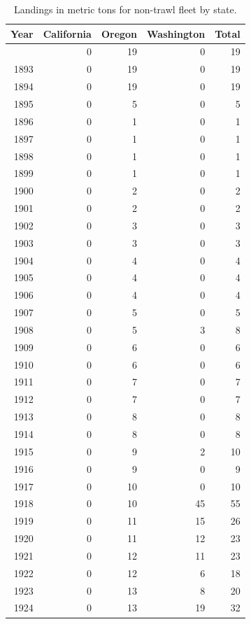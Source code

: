 \documentclass[
]{article}
\begin{document}
\begin{longtable}{rrrrr}

\caption{\label{tbl-NT_landings}Landings in metric tons for non-trawl
fleet by state.}

\tabularnewline

\toprule
Year & California & Oregon & Washington & Total \\ 
\midrule\addlinespace[2.5pt]
1892 & 0 & 19 & 0 & 19 \\ 
1893 & 0 & 19 & 0 & 19 \\ 
1894 & 0 & 19 & 0 & 19 \\ 
1895 & 0 & 5 & 0 & 5 \\ 
1896 & 0 & 1 & 0 & 1 \\ 
1897 & 0 & 1 & 0 & 1 \\ 
1898 & 0 & 1 & 0 & 1 \\ 
1899 & 0 & 1 & 0 & 1 \\ 
1900 & 0 & 2 & 0 & 2 \\ 
1901 & 0 & 2 & 0 & 2 \\ 
1902 & 0 & 3 & 0 & 3 \\ 
1903 & 0 & 3 & 0 & 3 \\ 
1904 & 0 & 4 & 0 & 4 \\ 
1905 & 0 & 4 & 0 & 4 \\ 
1906 & 0 & 4 & 0 & 4 \\ 
1907 & 0 & 5 & 0 & 5 \\ 
1908 & 0 & 5 & 3 & 8 \\ 
1909 & 0 & 6 & 0 & 6 \\ 
1910 & 0 & 6 & 0 & 6 \\ 
1911 & 0 & 7 & 0 & 7 \\ 
1912 & 0 & 7 & 0 & 7 \\ 
1913 & 0 & 8 & 0 & 8 \\ 
1914 & 0 & 8 & 0 & 8 \\ 
1915 & 0 & 9 & 2 & 10 \\ 
1916 & 0 & 9 & 0 & 9 \\ 
1917 & 0 & 10 & 0 & 10 \\ 
1918 & 0 & 10 & 45 & 55 \\ 
1919 & 0 & 11 & 15 & 26 \\ 
1920 & 0 & 11 & 12 & 23 \\ 
1921 & 0 & 12 & 11 & 23 \\ 
1922 & 0 & 12 & 6 & 18 \\ 
1923 & 0 & 13 & 8 & 20 \\ 
1924 & 0 & 13 & 19 & 32 \\ 

\end{longtable}
\end{document}
